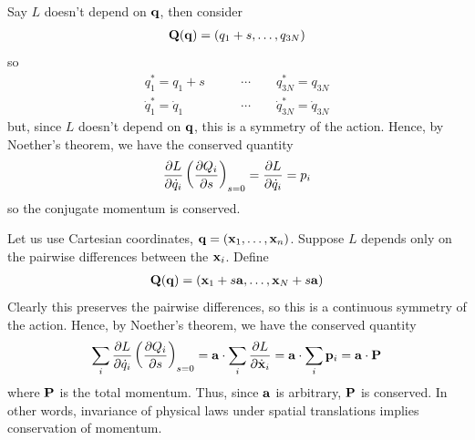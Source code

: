 \documentclass{../../template/note}
\begin{document}
    \begin{example*}
        Say $L$ doesn't depend on $\V q$, then consider
        \begin{align*}
            \V Q(\V q) = (q_1 + s, \dots, q_{3N})
        \end{align*}
        so
        \begin{align*}
            q_1^* = q_1 + s \qquad &\cdots \qquad q_{3N}^* = q_{3N} \\
            \dot q_1^* = \dot q_1 \qquad &\cdots \qquad \dot q_{3N}^* = \dot q_{3N}
        \end{align*}
        but, since $L$ doesn't depend on $\V q$, this is a symmetry of the action. Hence, by Noether's theorem, we have the conserved quantity
        \begin{align*}
            \pd{L}{\dot q_i} \left(\pd{Q_i}{s}\right)_{s=0} = \pd{L}{\dot q_i} = p_i
        \end{align*}
        so the conjugate momentum is conserved.       
    \end{example*}
    

    \begin{example*}
        Let us use Cartesian coordinates, $\V q = (\V x_1, \dots, \V x_n)$. Suppose $L$ depends only on the pairwise differences between the $\V x_i$. Define
        \begin{align*}
            \V Q(\V q) = (\V x_1 + s \V a, \dots, \V x_N + s \V a)
        \end{align*}
        Clearly this preserves the pairwise differences, so this is a continuous symmetry of the action. Hence, by Noether's theorem, we have the conserved quantity
        \begin{align*}
            \sum_i \pd{L}{\dot q_i} \left(\pd{Q_i}{s}\right)_{s=0} = \V a \cdot \sum_i \pd{L}{\dot{\V x}_i} = \V a \cdot \sum_i \V p_i = \V a \cdot \V P
        \end{align*}
        where $\V P$ is the total momentum. Thus, since $\V a$ is arbitrary, $\V P$ is conserved. In other words, invariance of physical laws under spatial translations implies conservation of momentum.       
    \end{example*}
    
\end{document}
